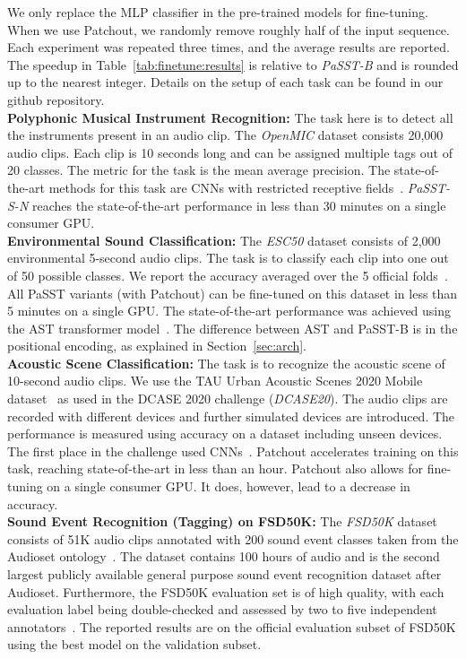 \documentclass[a4paper]{article}
\begin{document}
We only replace the MLP classifier in the pre-trained models for fine-tuning. When we use Patchout, we randomly remove roughly half of the input sequence. Each experiment was repeated three times, and the average results are reported. The speedup in  Table~\ref{tab:finetune:results} is relative to  \emph{PaSST-B} and is rounded up to the nearest integer. Details on the setup of each task can be found in our github repository.
\\
\textbf{Polyphonic Musical Instrument Recognition:}
The task here is to detect all the instruments present in an audio clip. The \emph{OpenMIC} dataset \cite{humphrey2018openmic} consists 20,000 audio clips. Each clip is 10 seconds long and can be assigned multiple tags out of 20 classes. The metric for the task is the mean average precision.
The state-of-the-art methods for this task are CNNs with restricted receptive fields~\cite{koutini21journal}. \emph{PaSST-S-N} reaches the state-of-the-art performance in less than 30 minutes on a single consumer GPU.
\\
\textbf{Environmental Sound Classification:}
The \emph{ESC50} dataset \cite{piczak2015dataset} consists of 2,000 environmental 5-second audio clips. The task is to classify each clip into one out of 50 possible classes. We report the accuracy averaged over the 5 official folds~\cite{piczak2015dataset}. All PaSST variants (with Patchout) can be fine-tuned on this dataset in less than 5 minutes on a single GPU. The state-of-the-art performance was achieved using the AST transformer model~\cite{gong21ast}. 
The difference between AST and PaSST-B is in the positional encoding, as explained in Section~\ref{sec:arch}.
\\
\textbf{Acoustic Scene Classification:}
The task is to recognize the acoustic scene of 10-second audio clips. We use the TAU Urban Acoustic Scenes 2020 Mobile dataset~\cite{Heittola2020} as used in the DCASE 2020 challenge (\emph{DCASE20}). The audio clips are recorded with different devices and further simulated devices are introduced. The performance is measured using accuracy on a dataset including  unseen devices. The first place in the challenge used CNNs~\cite{Suh2020task1a}. Patchout accelerates training on this task, reaching state-of-the-art in less than an hour. Patchout also allows for fine-tuning on a single consumer GPU. It does, however, lead to a decrease in accuracy.
\\
\textbf{Sound Event Recognition (Tagging) on FSD50K:}
The \emph{FSD50K} dataset \cite{fonsecaFPFS22FSD50K} consists of 51K audio clips annotated with 200 sound event classes taken from the Audioset ontology~\cite{audioset2017Gemmeke}. The dataset contains 100 hours of audio and is the second largest publicly available general purpose sound event recognition dataset after Audioset. Furthermore, the FSD50K evaluation set is of high quality, with each evaluation label being double-checked and assessed by two to five independent annotators~\cite{fonsecaFPFS22FSD50K}. The reported results are on the official evaluation subset of FSD50K using the best model on the validation subset. 
\end{document}
